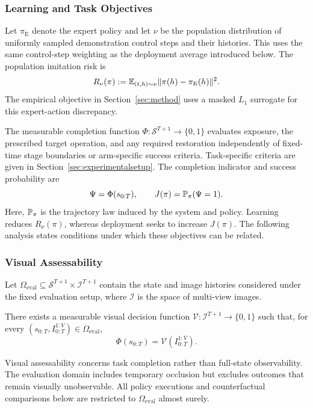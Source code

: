 \subsubsection{Learning and Task Objectives}
Let $\pi_{\mathrm E}$ denote the expert policy and let $\nu$ be the population distribution of uniformly sampled demonstration control steps and their histories.
This uses the same control-step weighting as the deployment average introduced below.
The population imitation risk is
\begin{equation}
 R_\nu(\pi)
 :=\mathbb E_{(t,h)\sim\nu}\lVert\pi(h)-\pi_{\mathrm E}(h)\rVert^2.
 \label{eq:populationimitationrisk}
\end{equation}
The empirical objective in Section~\ref{sec:method} uses a masked $L_1$ surrogate for this expert-action discrepancy.

The measurable completion function $\Phi:\mathcal S^{T+1}\to\{0,1\}$ evaluates exposure, the prescribed target operation, and any required restoration independently of fixed-time stage boundaries or arm-specific success criteria.
Task-specific criteria are given in Section~\ref{sec:experimentalsetup}.
The completion indicator and success probability are
\begin{equation}
 \Psi=\Phi(s_{0:T}),\qquad
 J(\pi)=\mathbb P_\pi(\Psi=1).
 \label{eq:visualtask}
\end{equation}
Here, $\mathbb P_\pi$ is the trajectory law induced by the system and policy.
Learning reduces $R_\nu(\pi)$, whereas deployment seeks to increase $J(\pi)$.
The following analysis states conditions under which these objectives can be related.

\subsubsection{Visual Assessability}
Let $\Omega_{\mathrm{eval}}\subseteq\mathcal S^{T+1}\times\mathcal I^{T+1}$ contain the state and image histories considered under the fixed evaluation setup, where $\mathcal I$ is the space of multi-view images.

\begin{assumption}
\label{ass:visualassessability}
There exists a measurable visual decision function $\mathcal V:\mathcal I^{T+1}\to\{0,1\}$
such that, for every $(s_{0:T},I_{0:T}^{1:V})\in\Omega_{\mathrm{eval}}$,
\begin{equation}
 \Phi(s_{0:T})=\mathcal V(I_{0:T}^{1:V}).
 \label{eq:visassumption}
\end{equation}
\end{assumption}
Visual assessability concerns task completion rather than full-state observability.
The evaluation domain includes temporary occlusion but excludes outcomes that remain visually unobservable.
All policy executions and counterfactual comparisons below are restricted to $\Omega_{\mathrm{eval}}$ almost surely.
